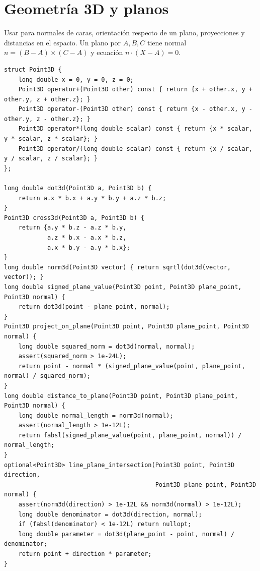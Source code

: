 \section{Geometr\'ia 3D y planos}

Usar para normales de caras, orientaci\'on respecto de un plano, proyecciones y
distancias en el espacio. Un plano por $A,B,C$ tiene normal
$n=(B-A)\times(C-A)$ y ecuaci\'on $n\cdot(X-A)=0$.


\begin{lstlisting}[style=cpp]
struct Point3D {
    long double x = 0, y = 0, z = 0;
    Point3D operator+(Point3D other) const { return {x + other.x, y + other.y, z + other.z}; }
    Point3D operator-(Point3D other) const { return {x - other.x, y - other.y, z - other.z}; }
    Point3D operator*(long double scalar) const { return {x * scalar, y * scalar, z * scalar}; }
    Point3D operator/(long double scalar) const { return {x / scalar, y / scalar, z / scalar}; }
};

long double dot3d(Point3D a, Point3D b) {
    return a.x * b.x + a.y * b.y + a.z * b.z;
}
Point3D cross3d(Point3D a, Point3D b) {
    return {a.y * b.z - a.z * b.y,
            a.z * b.x - a.x * b.z,
            a.x * b.y - a.y * b.x};
}
long double norm3d(Point3D vector) { return sqrtl(dot3d(vector, vector)); }
long double signed_plane_value(Point3D point, Point3D plane_point, Point3D normal) {
    return dot3d(point - plane_point, normal);
}
Point3D project_on_plane(Point3D point, Point3D plane_point, Point3D normal) {
    long double squared_norm = dot3d(normal, normal);
    assert(squared_norm > 1e-24L);
    return point - normal * (signed_plane_value(point, plane_point, normal) / squared_norm);
}
long double distance_to_plane(Point3D point, Point3D plane_point, Point3D normal) {
    long double normal_length = norm3d(normal);
    assert(normal_length > 1e-12L);
    return fabsl(signed_plane_value(point, plane_point, normal)) / normal_length;
}
optional<Point3D> line_plane_intersection(Point3D point, Point3D direction,
                                          Point3D plane_point, Point3D normal) {
    assert(norm3d(direction) > 1e-12L && norm3d(normal) > 1e-12L);
    long double denominator = dot3d(direction, normal);
    if (fabsl(denominator) < 1e-12L) return nullopt;
    long double parameter = dot3d(plane_point - point, normal) / denominator;
    return point + direction * parameter;
}
\end{lstlisting}

